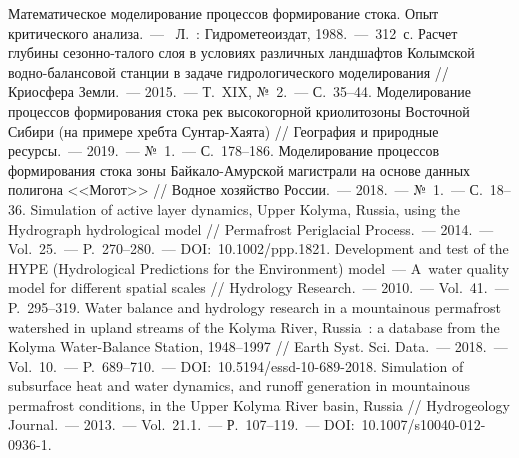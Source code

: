 \begin{thebibliography}{99}
\bibitem{} Математическое моделирование процессов формирование стока. Опыт критического анализа.~---  Л.~: Гидрометеоиздат, 1988.~--- 312~с.
\bibitem{} Расчет глубины сезонно-талого слоя в условиях различных ландшафтов Колымской водно-балансовой станции в задаче гидрологического моделирования // Криосфера Земли.~--- 2015.~--- Т.~XIX, №~2.~--- С.~35--44.
\bibitem{} Моделирование процессов формирования стока рек высокогорной криолитозоны Восточной Сибири (на примере хребта Сунтар-Хаята) // География и природные ресурсы.~--- 2019.~--- №~1.~--- С.~178--186.
\bibitem{} Моделирование процессов формирования стока зоны Байкало-Амурской магистрали на основе данных полигона <<Могот>> // Водное хозяйство России.~--- 2018.~--- №~1.~--- С.~18--36.
\bibitem{} Simulation of active layer dynamics, Upper Kolyma, Russia, using the Hydrograph hydrological model // Permafrost Periglacial Process.~--- 2014.~--- Vol.~25.~--- P.~270--280.~--- DOI:~10.1002/ppp.1821.
\bibitem{} Development and test of the HYPE (Hydrological Predictions for the Environment) model~--- A~water quality model for different spatial scales // Hydrology Research.~--- 2010.~--- Vol.~41.~--- P.~295--319.
\bibitem{} Water balance and hydrology research in a mountainous permafrost watershed in upland streams of the Kolyma River, Russia~: a database from the Kolyma Water-Balance Station, 1948--1997 // Earth Syst. Sci. Data.~--- 2018.~--- Vol.~10.~--- P.~689--710.~--- DOI:~10.5194/essd-10-689-2018.
\bibitem{} Simulation of subsurface heat and water dynamics, and runoff generation in mountainous permafrost conditions, in the Upper Kolyma River basin, Russia // Hydrogeology Journal.~--- 2013.~--- Vol.~21.1.~--- Р.~107--119.~--- DOI:~10.1007/s10040-012-0936-1.

\end{thebibliography}
